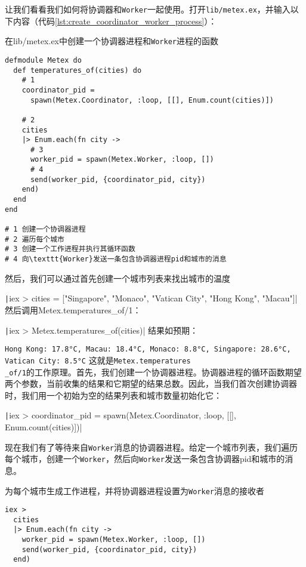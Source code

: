 让我们看看我们如何将协调器和\texttt{Worker}一起使用。打开\texttt{lib/metex.ex}，并输入以下内容（代码\ref{lst:create_coordinator_worker_process}）：


\begin{code}{在lib/metex.ex中创建一个协调器进程和\texttt{Worker}进程的函数}
\begin{verbatim}
defmodule Metex do
  def temperatures_of(cities) do
    # 1
    coordinator_pid =
      spawn(Metex.Coordinator, :loop, [[], Enum.count(cities)])

    # 2
    cities
    |> Enum.each(fn city ->
      # 3
      worker_pid = spawn(Metex.Worker, :loop, [])
      # 4
      send(worker_pid, {coordinator_pid, city})
    end)
  end
end

# 1 创建一个协调器进程 
# 2 遍历每个城市 
# 3 创建一个工作进程并执行其循环函数
# 4 向\texttt{Worker}发送一条包含协调器进程pid和城市的消息
\end{verbatim}
\label{lst:create_coordinator_worker_process}
\end{code}

然后，我们可以通过首先创建一个城市列表来找出城市的温度

\texttt|iex > cities = ["Singapore", "Monaco", "Vatican City", "Hong Kong", "Macau"]|
然后调用Metex.temperatures\_of/1：

\texttt|iex > Metex.temperatures_of(cities)|
结果如预期：

\texttt{Hong Kong: 17.8°C, Macau: 18.4°C, Monaco: 8.8°C, Singapore: 28.6°C, Vatican City: 8.5°C}
这就是\texttt{Metex.temperatures\\\_of/1}的工作原理。首先，我们创建一个协调器进程。协调器进程的循环函数期望两个参数，当前收集的结果和它期望的结果总数。因此，当我们首次创建协调器时，我们用一个初始为空的结果列表和城市数量初始化它：

\texttt|iex > coordinator_pid = spawn(Metex.Coordinator, :loop, [[], Enum.count(cities)])|

现在我们有了等待来自\texttt{Worker}消息的协调器进程。给定一个城市列表，我们遍历每个城市，创建一个\texttt{Worker}，然后向\texttt{Worker}发送一条包含协调器pid和城市的消息。

\begin{code}{为每个城市生成工作进程，并将协调器进程设置为\texttt{Worker}消息的接收者}
\begin{verbatim}
iex >
  cities
  |> Enum.each(fn city ->
    worker_pid = spawn(Metex.Worker, :loop, [])
    send(worker_pid, {coordinator_pid, city})
  end)
\end{verbatim}
\label{lst:generate_worker_process_for_each_city}
\end{code}

